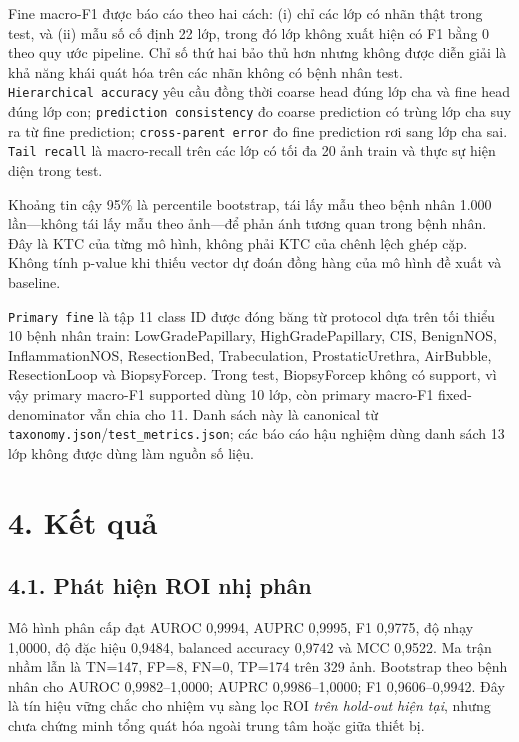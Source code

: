 \documentclass[
  10pt,
  a4paper,
  twocolumn]{article}
\begin{document}
Fine macro-F1 được báo cáo theo hai cách: (i) chỉ các lớp có nhãn thật
trong test, và (ii) mẫu số cố định 22 lớp, trong đó lớp không xuất hiện
có F1 bằng 0 theo quy ước pipeline. Chỉ số thứ hai bảo thủ hơn nhưng
không được diễn giải là khả năng khái quát hóa trên các nhãn không có
bệnh nhân test. \texttt{Hierarchical\ accuracy} yêu cầu đồng thời coarse
head đúng lớp cha và fine head đúng lớp con;
\texttt{prediction\ consistency} đo coarse prediction có trùng lớp cha
suy ra từ fine prediction; \texttt{cross-parent\ error} đo fine
prediction rơi sang lớp cha sai. \texttt{Tail\ recall} là macro-recall
trên các lớp có tối đa 20 ảnh train và thực sự hiện diện trong test.

Khoảng tin cậy 95\% là percentile bootstrap, tái lấy mẫu theo bệnh nhân
1.000 lần---không tái lấy mẫu theo ảnh---để phản ánh tương quan trong
bệnh nhân. Đây là KTC của từng mô hình, không phải KTC của chênh lệch
ghép cặp. Không tính p-value khi thiếu vector dự đoán đồng hàng của mô
hình đề xuất và baseline.

\texttt{Primary\ fine} là tập 11 class ID được đóng băng từ protocol dựa
trên tối thiểu 10 bệnh nhân train: Low\allowbreak{}Grade\allowbreak{}Papillary,
High\allowbreak{}Grade\allowbreak{}Papillary, CIS, BenignNOS, InflammationNOS, ResectionBed,
Trabeculation, ProstaticUrethra, AirBubble, ResectionLoop và
BiopsyForcep. Trong test, BiopsyForcep không có support, vì vậy primary
macro-F1 supported dùng 10 lớp, còn primary macro-F1 fixed-denominator
vẫn chia cho 11. Danh sách này là canonical từ
\texttt{taxonomy.json}/\texttt{test\_metrics.json}; các báo cáo hậu
nghiệm dùng danh sách 13 lớp không được dùng làm nguồn số liệu.

\section{4. Kết quả}\label{kux1ebft-quux1ea3}

\subsection{4.1. Phát hiện ROI nhị
phân}\label{phuxe1t-hiux1ec7n-roi-nhux1ecb-phuxe2n}

Mô hình phân cấp đạt AUROC 0,9994, AUPRC 0,9995, F1 0,9775, độ nhạy
1,0000, độ đặc hiệu 0,9484, balanced accuracy 0,9742 và MCC 0,9522. Ma
trận nhầm lẫn là TN=147, FP=8, FN=0, TP=174 trên 329 ảnh. Bootstrap theo
bệnh nhân cho AUROC 0,9982--1,0000; AUPRC 0,9986--1,0000; F1
0,9606--0,9942. Đây là tín hiệu vững chắc cho nhiệm vụ sàng lọc ROI
\emph{trên hold-out hiện tại}, nhưng chưa chứng minh tổng quát hóa ngoài
trung tâm hoặc giữa thiết bị.
\end{document}
